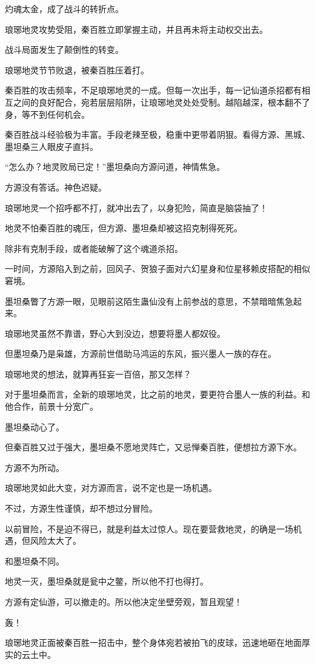 \begin{this_body}
灼魂太金，成了战斗的转折点。

琅琊地灵攻势受阻，秦百胜立即掌握主动，并且再未将主动权交出去。

战斗局面发生了颠倒性的转变。

琅琊地灵节节败退，被秦百胜压着打。

秦百胜的攻击频率，不足琅琊地灵的一成。但每一次出手，每一记仙道杀招都有相互之间的良好配合，宛若层层陷阱，让琅琊地灵处处受制。越陷越深，根本翻不了身，等不到任何机会。

秦百胜战斗经验极为丰富。手段老辣至极，稳重中更带着阴狠。看得方源、黑城、墨坦桑三人眼皮子直抖。

“怎么办？地灵败局已定！”墨坦桑向方源问道，神情焦急。

方源没有答话。神色迟疑。

琅琊地灵一个招呼都不打，就冲出去了，以身犯险，简直是脑袋抽了！

地灵不怕秦百胜的魂压，但方源、墨坦桑却被这招克制得死死。

除非有克制手段，或者能破解了这个魂道杀招。

一时间，方源陷入到之前，回风子、贺狼子面对六幻星身和位星移赖皮搭配的相似窘境。

墨坦桑瞥了方源一眼，见眼前这陌生蛊仙没有上前参战的意思，不禁暗暗焦急起来。

琅琊地灵虽然不靠谱，野心大到没边，想要将墨人都奴役。

但墨坦桑乃是枭雄，方源前世借助马鸿运的东风，振兴墨人一族的存在。

琅琊地灵的想法，就算再狂妄一百倍，那又怎样？

对于墨坦桑而言，全新的琅琊地灵，比之前的地灵，要更符合墨人一族的利益。和他合作，前景十分宽广。

墨坦桑动心了。

但秦百胜又过于强大，墨坦桑不愿地灵阵亡，又忌惮秦百胜，便想拉方源下水。

方源不为所动。

琅琊地灵如此大变，对方源而言，说不定也是一场机遇。

不过，方源生性谨慎，却不想过分冒险。

以前冒险，不是迫不得已，就是利益太过惊人。现在要营救地灵，的确是一场机遇，但风险太大了。

和墨坦桑不同。

地灵一灭，墨坦桑就是瓮中之鳖，所以他不打也得打。

方源有定仙游，可以撤走的。所以他决定坐壁旁观，暂且观望！

轰！

琅琊地灵正面被秦百胜一招击中，整个身体宛若被拍飞的皮球，迅速地砸在地面厚实的云土中。


\end{this_body}
